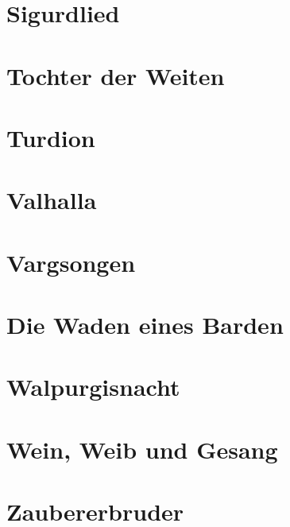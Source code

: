 \documentclass{article}
\begin{document}
\section{Sigurdlied}


\section{Tochter der Weiten}


\section{Turdion}


\section{Valhalla}


\section{Vargsongen}


\section{Die Waden eines Barden}


\section{Walpurgisnacht}


\section{Wein, Weib und Gesang}


\section{Zaubererbruder}

\end{document}
